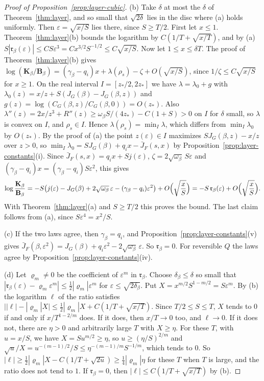 \begin{proof}[Proof of Proposition~\ref{prop:layer-cubic}]
(b) Take $\delta$ at most the $\delta$ of Theorem~\ref{thm:layer}, and so small that
$\sqrt{2\delta}$ lies in the disc where (a) holds uniformly. Then $\varepsilon=\sqrt{x/S}$ lies
there, since $S\ge T/2$. First let $x\le1$. Theorem~\ref{thm:layer}(b) bounds the logarithm by
$C(1/T+\sqrt{x/T})$, and by (a) $S|\mathfrak r_\beta(\varepsilon)|\le CS\varepsilon^3=Cx^{3/2}S^{-1/2}\le
C\sqrt{x/S}$. Now let $1\le x\le\delta T$. The proof of Theorem~\ref{thm:layer}(b) gives
$\log(\mathbf K_\beta/\mathbf B_\beta)=(\gamma_\beta-q_i)x+\lambda(\rho_s)-\zeta+O(\sqrt{x/S})$,
since $1/\zeta\le C\sqrt{x/S}$ for $x\ge1$. On the real interval $I=[z_*/2,2z_*]$ we have
$\lambda=\lambda_0+g$ with $\lambda_0(z)=x/z+S(J_G(\beta)-J_G(\beta,z))$ and
$g(z)=\log(C_G(\beta,z)/C_G(\beta,0))=O(z_*)$. Also
$\lambda''(z)=2x/z^3+R''(z)\ge\omega_\beta S/(4z_*)-C(1+S)>0$ on $I$ for $\delta$ small, so
$\lambda$ is convex on $I$, and $\rho_s\in I$. Hence $\lambda(\rho_s)=\min_I\lambda$, which differs
from $\min_I\lambda_0$ by $O(z_*)$. By the proof of (a) the point $z(\varepsilon)\in I$ maximizes
$SJ_G(\beta,z)-x/z$ over $z>0$, so
$\min_I\lambda_0=SJ_G(\beta)+q_ix-\bar J_F(s,x)$ by Proposition~\ref{prop:layer-constants}(i).
Since $\bar J_F(s,x)=q_ix+Sj(\varepsilon)$, $\zeta=2\sqrt{\omega_\beta}\,S\varepsilon$ and
$(\gamma_\beta-q_i)x=(\gamma_\beta-q_i)S\varepsilon^2$, this gives
\[
\log\frac{\mathbf K_\beta}{\mathbf B_\beta}=-S\bigl(j(\varepsilon)-J_G(\beta)+2\sqrt{\omega_\beta}\,\varepsilon-(\gamma_\beta-q_i)\varepsilon^2\bigr)+O\Bigl(\sqrt{\frac xS}\Bigr)
=-S\,\mathfrak r_\beta(\varepsilon)+O\Bigl(\sqrt{\frac xS}\Bigr).
\]
With Theorem~\ref{thm:layer}(a) and $S\ge T/2$ this proves the bound. The last claim follows
from (a), since $S\varepsilon^4=x^2/S$.

(c) If the two laws agree, then $\gamma_\beta=q_i$, and
Proposition~\ref{prop:layer-constants}(v) gives
$\bar J_F(\beta,\varepsilon^2)=J_G(\beta)+q_i\varepsilon^2-2\sqrt{\omega_\beta}\,\varepsilon$. So
$\mathfrak r_\beta=0$. For reversible $Q$ the laws agree by
Proposition~\ref{prop:layer-constants}(iv).

(d) Let $\varrho_m\ne0$ be the coefficient of $\varepsilon^m$ in $\mathfrak r_\beta$. Choose $\delta_\beta\le\delta$
so small that $|\mathfrak r_\beta(\varepsilon)-\varrho_m\varepsilon^m|\le\frac12|\varrho_m|\varepsilon^m$ for
$\varepsilon\le\sqrt{2\delta_\beta}$. Put $X=x^{m/2}S^{1-m/2}=S\varepsilon^m$. By (b) the logarithm
$\ell$ of the ratio satisfies $\bigl||\ell|-|\varrho_m|X\bigr|\le\frac12|\varrho_m|X+C(1/T+\sqrt{x/T})$.
Since $T/2\le S\le T$, $X$ tends to $0$ if and only if $x/T^{1-2/m}$ does. If it does, then
$x/T\to0$ too, and $\ell\to0$. If it does not, there are $\eta>0$ and arbitrarily large $T$ with
$X\ge\eta$. For these $T$, with $u=x/S$, we have $X=Su^{m/2}\ge\eta$, so $u\ge(\eta/S)^{2/m}$ and
$\sqrt u/X=u^{-(m-1)/2}/S\le\eta^{-(m-1)/m}S^{-1/m}$, which tends to $0$. So
$|\ell|\ge\frac12|\varrho_m|X-C(1/T+\sqrt{2u})\ge\frac14|\varrho_m|\eta$ for these $T$ when $T$ is
large, and the ratio does not tend to $1$. If $\mathfrak r_\beta=0$, then $|\ell|\le C(1/T+\sqrt{x/T})$ by
(b).


\end{proof}
